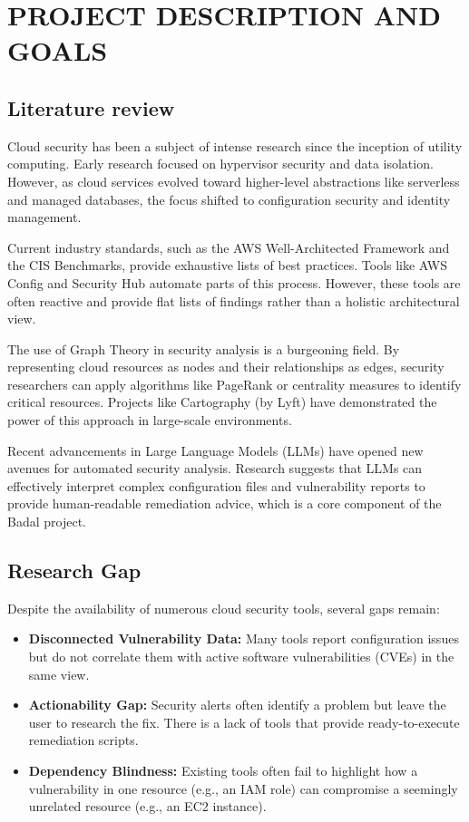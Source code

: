 \chapter{\MakeUppercase{Project Description and Goals}}
\section{Literature review}
Cloud security has been a subject of intense research since the inception of utility computing. Early research focused on hypervisor security and data isolation. However, as cloud services evolved toward higher-level abstractions like serverless and managed databases, the focus shifted to configuration security and identity management.

Current industry standards, such as the AWS Well-Architected Framework and the CIS Benchmarks, provide exhaustive lists of best practices. Tools like AWS Config and Security Hub automate parts of this process. However, these tools are often reactive and provide flat lists of findings rather than a holistic architectural view.

The use of Graph Theory in security analysis is a burgeoning field. By representing cloud resources as nodes and their relationships as edges, security researchers can apply algorithms like PageRank or centrality measures to identify critical resources. Projects like Cartography (by Lyft) have demonstrated the power of this approach in large-scale environments.

Recent advancements in Large Language Models (LLMs) have opened new avenues for automated security analysis. Research suggests that LLMs can effectively interpret complex configuration files and vulnerability reports to provide human-readable remediation advice, which is a core component of the Badal project.

\section{Research Gap}
Despite the availability of numerous cloud security tools, several gaps remain:
\begin{itemize}
	\item \textbf{Disconnected Vulnerability Data:} Many tools report configuration issues but do not correlate them with active software vulnerabilities (CVEs) in the same view.
	\item \textbf{Actionability Gap:} Security alerts often identify a problem but leave the user to research the fix. There is a lack of tools that provide ready-to-execute remediation scripts.
	\item \textbf{Dependency Blindness:} Existing tools often fail to highlight how a vulnerability in one resource (e.g., an IAM role) can compromise a seemingly unrelated resource (e.g., an EC2 instance).
\end{itemize}


